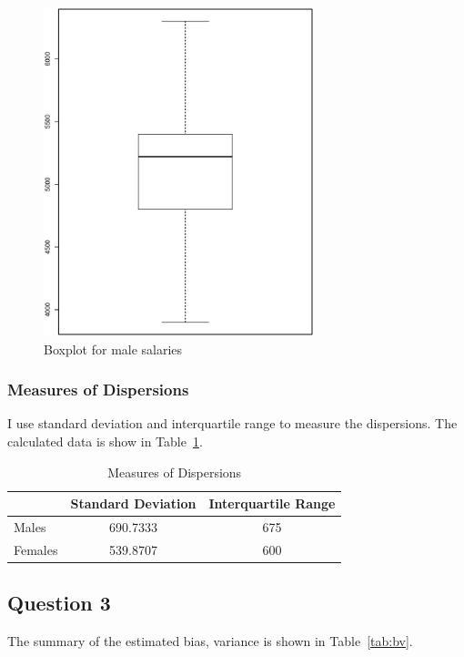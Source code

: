 \documentclass{article}
\begin{document}
\begin{figure}[ht!]
  \centering
  \includegraphics[width=0.7\textwidth]{boxplot_female}
  \caption{Boxplot for male salaries\label{fig:boxf}}
\end{figure}

\subsubsection{Measures of Dispersions}
I use standard deviation and interquartile range to measure the
dispersions. The calculated data is show in Table~\ref{tab:md}.

\begin{table}[ht!]
  \begin{center}
    \begin{tabular}{|l|c|c|}
                                                                 \hline
               &  Standard Deviation &  Interquartile Range   \\ \hline
      Males    &  690.7333           &    675                 \\ \hline
      Females  &  539.8707           &    600                 \\ \hline
    \end{tabular}
  \end{center}
  \caption{Measures of Dispersions \label{tab:md}}
\end{table}

\subsection{Question 3}
The summary of the estimated bias, variance is shown in
Table~\ref{tab:bv}.
\end{document}
